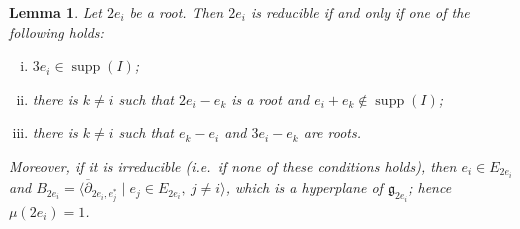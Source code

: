 \documentclass[11pt,letterpaper,reqno]{amsart}
\newtheorem{lemma}[lemma]{Lemma}
\theoremstyle{remark}
\theoremstyle{definition}
\newcommand{\supp}[0]{\ensuremath{\operatorname{supp}}}
\begin{document}
\begin{lemma}\label{prop:two-ei-criterion}
Let $2e_i$ be a root. Then $2e_i$ is reducible if and only if one of the
following holds:
\begin{enumerate}[(i)]
\item $3e_i\in\supp(I)$;
\item there is $k\neq i$ such that $2e_i-e_k$ is a root and
      $e_i+e_k\notin\supp(I)$;
\item there is $k\neq i$ such that $e_k-e_i$ and $3e_i-e_k$ are roots.
\end{enumerate}
Moreover, if it is irreducible (i.e.~if none of these conditions holds), then $e_i\in E_{2e_i}$ and $B_{2e_i}=\langle\overline\partial_{2e_i,e_j^*}\mid e_j\in E_{2e_i},\ j\neq i\rangle$, which is a hyperplane of $\mathfrak g_{2e_i}$; hence $\mu(2e_i)=1$.
\end{lemma}
\end{document}
